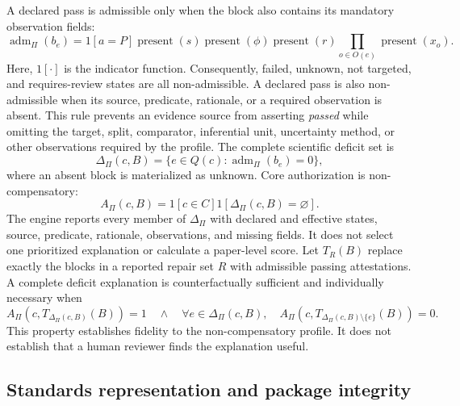 A declared pass is admissible only when the block also contains its mandatory observation fields:
\begin{equation}
\operatorname{adm}_{\Pi}(b_e)=
\mathrm{1}[a=P]\operatorname{present}(s)\operatorname{present}(\phi)
\operatorname{present}(r)\prod_{o\in O(e)}\operatorname{present}(x_o).
\label{eq:admissibility}
\end{equation}
Here, $\mathrm{1}[\cdot]$ is the indicator function. Consequently, failed, unknown, not targeted, and requires-review states are all non-admissible. A declared pass is also non-admissible when its source, predicate, rationale, or a required observation is absent. This rule prevents an evidence source from asserting \emph{passed} while omitting the target, split, comparator, inferential unit, uncertainty method, or other observations required by the profile. The complete scientific deficit set is
\begin{equation}
\Delta_{\Pi}(c,B)=\{e\in Q(c):\operatorname{adm}_{\Pi}(b_e)=0\},
\label{eq:scientific-deficits}
\end{equation}
where an absent block is materialized as unknown. Core authorization is non-compensatory:
\begin{equation}
A_{\Pi}(c,B)=\mathrm{1}[c\in C]\mathrm{1}[\Delta_{\Pi}(c,B)=\varnothing].
\label{eq:core-authorization}
\end{equation}
The engine reports every member of $\Delta_{\Pi}$ with declared and effective states, source, predicate, rationale, observations, and missing fields. It does not select one prioritized explanation or calculate a paper-level score. Let $T_R(B)$ replace exactly the blocks in a reported repair set $R$ with admissible passing attestations. A complete deficit explanation is counterfactually sufficient and individually necessary when
\begin{equation}
A_{\Pi}(c,T_{\Delta_{\Pi}(c,B)}(B))=1
\quad\land\quad
\forall e\in\Delta_{\Pi}(c,B),\quad
A_{\Pi}(c,T_{\Delta_{\Pi}(c,B)\setminus\{e\}}(B))=0.
\label{eq:counterfactual-explanation}
\end{equation}
This property establishes fidelity to the non-compensatory profile. It does not establish that a human reviewer finds the explanation useful.

\subsection{Standards representation and package integrity}
\label{subsec:standards-integrity}

